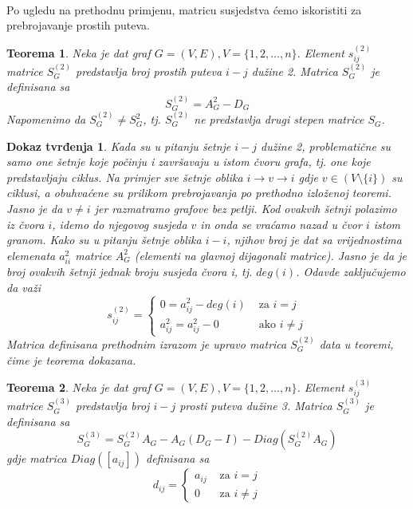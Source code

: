 \documentclass[11pt]{article}
\newtheorem{theorem}{Teorema}
\newtheorem*{custom_proof}{Dokaz tvrđenja}
\begin{document}
			\paragraph{}
			Po ugledu na prethodnu primjenu, matricu susjedstva ćemo iskoristiti za prebrojavanje prostih puteva.
	
			\begin{theorem}
			Neka je dat graf $G = (V, E), V = \{1, 2, \dots, n\}$. Element $s_{ij}^{(2)}$ matrice $S_G^{(2)}$ predstavlja broj prostih puteva $i-j$ dužine 2. Matrica $S_G^{(2)}$ je definisana sa
			\[
			S_G^{(2)} = A_G^{2} - D_G
			\]  
			Napomenimo da $S_G^{(2)} \neq S_G^{2}$, tj. $S_G^{(2)}$ ne predstavlja drugi stepen matrice $S_G$.
			\end{theorem}
		
			\begin{custom_proof}
			Kada su u pitanju šetnje $i-j$ dužine 2, problematične su samo one šetnje koje počinju i završavaju u istom čvoru grafa, tj. one koje predstavljaju ciklus. 
		 	Na primjer sve šetnje oblika $i \rightarrow v \rightarrow i$ gdje $v \in (V \setminus \{i\})$ su ciklusi, a obuhvaćene su prilikom prebrojavanja po prethodno izloženoj teoremi.
			Jasno je da $v \neq i$ jer razmatramo grafove bez petlji. 
			Kod ovakvih šetnji polazimo iz čvora $i$, idemo do njegovog susjeda $v$ in onda se vraćamo nazad u čvor $i$ istom granom.
			Kako su u pitanju šetnje oblika $i-i$, njihov broj je dat sa vrijednostima elemenata $a_{ii}^2$ matrice $A_G^2$ (elementi na glavnoj dijagonali matrice). 
			Jasno je da je broj ovakvih šetnji jednak broju susjeda čvora i, tj. $deg(i)$. Odavde zaključujemo da važi
				\[
				s_{ij}^{(2)} = 
				 \begin{cases}
				 0 = a_{ij}^2 - deg(i) &  \text{ za } i = j  \\ 
				 a_{ij}^2 = a_{ij}^2 - 0   & \text{ ako } i \neq j 
				 \end{cases}
				\]  
			Matrica definisana prethodnim izrazom je upravo matrica $S_G^{(2)}$ data u teoremi, čime je teorema dokazana.
			\end{custom_proof}
	
			\begin{theorem}
			Neka je dat graf $G = (V, E), V = \{1, 2, \dots, n\}$. Element $s_{ij}^{(3)}$ matrice $S_G^{(3)}$ predstavlja broj $i-j$ prosti puteva dužine 3. Matrica $S_G^{(3)}$ je definisana sa
			\[
			S_G^{(3)} = S_G^{(2)} A_G - A_G (D_G - I) - Diag(S_G^{(2)} A_G) 
			\]  
			gdje matrica $Diag([a_{ij}])$ definisana sa
			\[
			d_{ij} = 
			 \begin{cases}
				a_{ij} &  \text{ za } i = j  \\ 
			 	0   & \text{ za } i \neq j 
			 \end{cases}
			\]
			\end{theorem}
	
\end{document}
